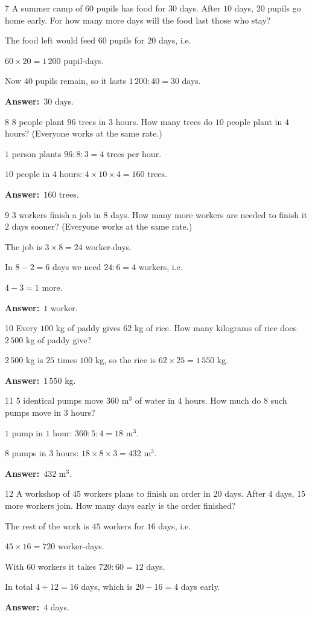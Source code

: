 \documentclass[11pt]{article}
\newif\ifsol \solfalse
\providecommand{\AnsWord}{Đáp số}
\newcommand{\dapso}[1]{\par\textbf{\AnsWord:}\ #1}
\newcommand{\probsol}[1]{%
  \begin{lrbox}{\solmeasure}\begin{minipage}{\dimexpr\linewidth-24pt\relax}#1\end{minipage}\end{lrbox}%
  \ifsol
    \begin{solbox}#1\end{solbox}%
  \else
    \setlength{\solht}{\dimexpr\ht\solmeasure+\dp\solmeasure+0.85cm\relax}%
    \ifdim\solht<1.35cm\setlength{\solht}{1.35cm}\fi
    \begin{tcolorbox}[colback=white,colframe=Line,boxrule=0.8pt,arc=5pt,
      left=8pt,right=8pt,top=4pt,bottom=4pt,height=\solht]{\footnotesize\color{Slate}\itshape\WorkWord}\end{tcolorbox}%
  \fi}
\newcommand{\gap}{\vspace{0.3cm}}
\def\WorkWord{Your work:}
\def\AnsWord{Answer}
\begin{document}
\gap
\begin{probbox}{7}{\relax}
A summer camp of $60$ pupils has food for $30$ days. After $10$ days, $20$ pupils go home early. For how many more days will the food last those who stay?
\end{probbox}
\probsol{
The food left would feed $60$ pupils for $20$ days, i.e.\par $60\times20=1\,200$ pupil-days.\par Now $40$ pupils remain, so it lasts $1\,200:40=30$ days.
\dapso{$30$ days.}}
\gap
\begin{probbox}{8}{\relax}
$8$ people plant $96$ trees in $3$ hours. How many trees do $10$ people plant in $4$ hours? (Everyone works at the same rate.)
\end{probbox}
\probsol{
$1$ person plants $96:8:3=4$ trees per hour.\par $10$ people in $4$ hours: $4\times10\times4=160$ trees.
\dapso{$160$ trees.}}
\gap
\begin{probbox}{9}{\relax}
$3$ workers finish a job in $8$ days. How many more workers are needed to finish it $2$ days sooner? (Everyone works at the same rate.)
\end{probbox}
\probsol{
The job is $3\times8=24$ worker-days.\par In $8-2=6$ days we need $24:6=4$ workers, i.e.\par $4-3=1$ more.
\dapso{$1$ worker.}}
\gap
\begin{probbox}{10}{\relax}
Every $100$ kg of paddy gives $62$ kg of rice. How many kilograms of rice does $2\,500$ kg of paddy give?
\end{probbox}
\probsol{
$2\,500$ kg is $25$ times $100$ kg, so the rice is $62\times25=1\,550$ kg.
\dapso{$1\,550$ kg.}}
\gap
\begin{probbox}{11}{\relax}
$5$ identical pumps move $360$ m$^3$ of water in $4$ hours. How much do $8$ such pumps move in $3$ hours?
\end{probbox}
\probsol{
$1$ pump in $1$ hour: $360:5:4=18$ m$^3$.\par $8$ pumps in $3$ hours: $18\times8\times3=432$ m$^3$.
\dapso{$432$ m$^3$.}}
\gap
\begin{probbox}{12}{\relax}
A workshop of $45$ workers plans to finish an order in $20$ days. After $4$ days, $15$ more workers join. How many days early is the order finished?
\end{probbox}
\probsol{
The rest of the work is $45$ workers for $16$ days, i.e.\par $45\times16=720$ worker-days.\par With $60$ workers it takes $720:60=12$ days.\par
In total $4+12=16$ days, which is $20-16=4$ days early.
\dapso{$4$ days.}}
\end{document}
